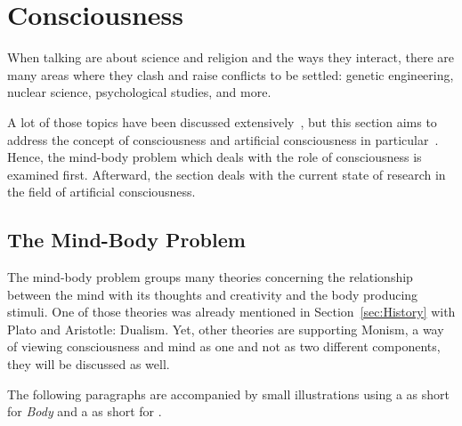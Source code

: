 \section{Consciousness}
\label{sec:Consciousness}

When talking are about science and religion and the ways they interact, there are many areas where they clash and raise conflicts to be settled: genetic engineering, nuclear science, psychological studies, and more.

A lot of those topics have been discussed extensively~\cite{barbour1993ethics,pfleiderer2010genethics,chernus1991nuclear}, but this section aims to address the concept of consciousness and artificial consciousness in particular~\cite{buttazzo2001artificial,chella2013artificial}.
Hence, the mind-body problem which deals with the role of consciousness is examined first.
Afterward, the section deals with the current state of research in the field of artificial consciousness.

\def\lmibop#1{\texttt{[image: figures/asq\_mibop\_\#1-compressed.pdf]}}

\newcommand*\moppreview[2]{\needspace{3\baselineskip}\paragraph[#2]{\smash{\raisebox{-2.3\baselineskip}{\lmibop{#1}}} #2}%
\parshape=4
0cm \linewidth
1.65cm \dimexpr\linewidth-1.65cm\relax
1.5cm \dimexpr\linewidth-1.5cm\relax
0cm \linewidth}

\subsection{The Mind-Body Problem}
\label{subsec:mind-body}The mind-body problem groups many theories concerning the relationship between the mind with its thoughts and creativity and the body producing stimuli.
One of those theories was already mentioned in Section~\ref{sec:History} with Plato and Aristotle: Dualism.
Yet, other theories are supporting Monism, a way of viewing consciousness and mind as one and not as two different components, they will be discussed as well.

The following paragraphs are accompanied by small illustrations using a  as short for \emph{Body} and a  as short for .


